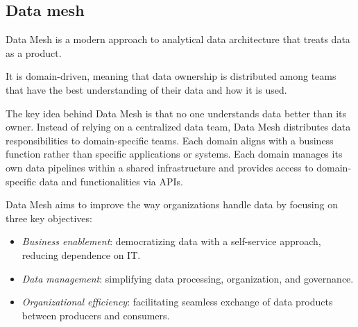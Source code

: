 \subsection{Data mesh}
\begin{definition}
    Data Mesh is a modern approach to analytical data architecture that treats data as a product.
\end{definition}
\noindent It is domain-driven, meaning that data ownership is distributed among teams that have the best understanding of their data and how it is used.

The key idea behind Data Mesh is that no one understands data better than its owner. 
Instead of relying on a centralized data team, Data Mesh distributes data responsibilities to domain-specific teams. 
Each domain aligns with a business function rather than specific applications or systems.
Each domain manages its own data pipelines within a shared infrastructure and provides access to domain-specific data and functionalities via APIs.

Data Mesh aims to improve the way organizations handle data by focusing on three key objectives:
\begin{itemize}
    \item \textit{Business enablement}: democratizing data with a self-service approach, reducing dependence on IT.
    \item \textit{Data management}: simplifying data processing, organization, and governance.
    \item \textit{Organizational efficiency}: facilitating seamless exchange of data products between producers and consumers.
\end{itemize}


